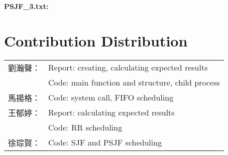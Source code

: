 \documentclass{article}
\begin{document}
        {\noindent\bfseries PSJF\_3.txt:}
        \begin{parcolumns}[nofirstindent, colwidths={1=.2\linewidth}, rulebetween=true]{2}
        \end{parcolumns}
\section{Contribution Distribution}
    \begin{table}[H]
    \large
    \begin{tabular}{ll}
    劉瀚聲：&Report: creating, calculating expected results\\
    　　　　&Code: main function and structure, child process\\
    馬揚格：&Code: system call, FIFO scheduling\\
    王郁婷：&Report: calculating expected results\\
    　　　　&Code: RR scheduling\\
    徐琮賀：&Code: SJF and PSJF scheduling\\
    \end{tabular}
    \end{table}
\end{document}
